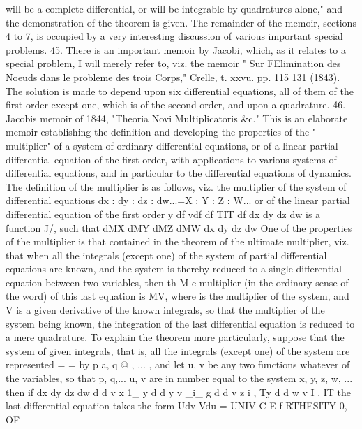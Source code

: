 \documentclass[12pt,a4paper]{article}
\theoremstyle{definition}
\begin{document}

will be a complete differential, or will be integrable by quadratures alone," and the
demonstration of the theorem is given. The remainder of the memoir, sections 4 to 7,
is occupied by a very interesting discussion of various important special problems.
45. There is an important memoir by Jacobi, which, as it relates to a special
problem, I will merely refer to, viz. the memoir " Sur FElimination des Noeuds dans
le probleme des trois Corps," Crelle, t. xxvu. pp. 115 131 (1843). The solution is
made to depend upon six differential equations, all of them of the first order except
one, which is of the second order, and upon a quadrature.
46. Jacobis memoir of 1844, "Theoria Novi Multiplicatoris &c." This is an
elaborate memoir establishing the definition and developing the properties of the
" multiplier" of a system of ordinary differential equations, or of a linear partial
differential equation of the first order, with applications to various systems of differential
equations, and in particular to the differential equations of dynamics. The definition
of the multiplier is as follows, viz. the multiplier of the system of differential equations
dx : dy : dz : dw...=X : Y : Z : W...
or of the linear partial differential equation of the first order
y df vdf df TIT df
dx dy dz dw
is a function J/, such that
dMX dMY dMZ dMW
dx dy dz dw
One of the properties of the multiplier is that contained in the theorem of the
ultimate multiplier, viz. that when all the integrals (except one) of the system of
partial differential equations are known, and the system is thereby reduced to a single
differential equation between two variables, then th M e multiplier (in the ordinary sense
of the word) of this last equation is MV, where is the multiplier of the system,
and V is a given derivative of the known integrals, so that the multiplier of the
system being known, the integration of the last differential equation is reduced to a
mere quadrature. To explain the theorem more particularly, suppose that the system
of given integrals, that is, all the integrals (except one) of the system are represented
= =
by p a, q @ , ... , and let u, v be any two functions whatever of the variables, so
that p, q,... u, v are in number equal to the system x, y, z, w, ... then if
dx dy dz dw
d d v x 1_ y d d y v _i_ g d d v z i , Ty d d w v I . IT
the last differential equation takes the form
Udv-Vdu = UNIV C E f RTHESITY
0,
OF


\end{document}
